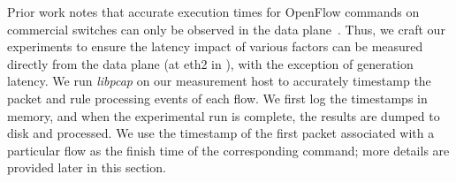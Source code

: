 Prior work notes that accurate execution times for OpenFlow commands on
commercial switches can only be observed in the data plane~\cite{oflops}.
Thus, we craft our experiments to ensure the latency impact of various
factors can be measured directly from the data plane (at eth2 in
), with the exception of \packetin generation
latency. We run \emph{libpcap} on our measurement host to accurately
timestamp the packet and rule processing events of each flow. We first log
the timestamps in memory, and when the experimental run is complete, the
results are dumped to disk and processed. We use the timestamp of the
first packet associated with a particular flow as the finish time of the
corresponding \flowmod command; more details are provided later in this
section.


